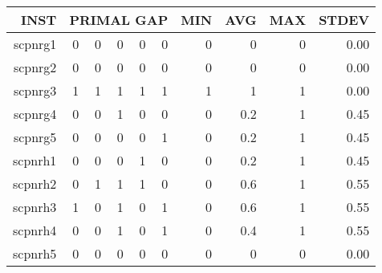 \documentclass[11pt]{article}
\begin{document}
    \begin{landscape}
        \begin{table}[]
            \begin{center}
            \begin{tabular}{r|rrrrr|rrrr}
                INST    & \multicolumn{5}{l}{PRIMAL GAP} & MIN & AVG & MAX & STDEV \\
                \hline
                scpnrg1 & 0    & 0    & 0    & 0   & 0   & 0   & 0   & 0   & 0.00  \\
                scpnrg2 & 0    & 0    & 0    & 0   & 0   & 0   & 0   & 0   & 0.00  \\
                scpnrg3 & 1    & 1    & 1    & 1   & 1   & 1   & 1   & 1   & 0.00  \\
                scpnrg4 & 0    & 0    & 1    & 0   & 0   & 0   & 0.2 & 1   & 0.45  \\
                scpnrg5 & 0    & 0    & 0    & 0   & 1   & 0   & 0.2 & 1   & 0.45  \\
                scpnrh1 & 0    & 0    & 0    & 1   & 0   & 0   & 0.2 & 1   & 0.45  \\
                scpnrh2 & 0    & 1    & 1    & 1   & 0   & 0   & 0.6 & 1   & 0.55  \\
                scpnrh3 & 1    & 0    & 1    & 0   & 1   & 0   & 0.6 & 1   & 0.55  \\
                scpnrh4 & 0    & 0    & 1    & 0   & 1   & 0   & 0.4 & 1   & 0.55  \\
                scpnrh5 & 0    & 0    & 0    & 0   & 0   & 0   & 0   & 0   & 0.00
            \end{tabular}
            \end{center}
        \end{table}


\end{landscape}
\end{document}
